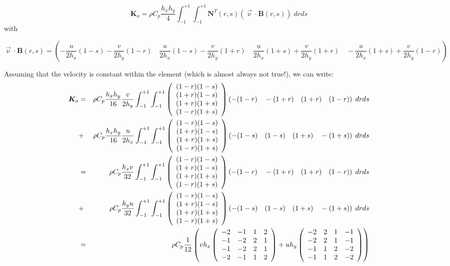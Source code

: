 \[
{\bm K}_a = \rho C_p \frac{h_xh_y}{4}
\int_{-1}^{+1} \int_{-1}^{+1} {\bm N}^T(r,s) (\vec\upnu \cdot {\bm B}(r,s)) \; dr ds
\]
with 
\begin{small}
\[
\vec\upnu \cdot  {\bm B}(r,s) 
=
\left(
-\frac{u}{2h_x}(1-s)\!-\!\frac{v}{2h_y}(1-r) \quad
 \frac{u}{2h_x}(1-s)\!-\!\frac{v}{2h_y}(1+r) \quad
 \frac{u}{2h_x}(1+s)\!+\!\frac{v}{2h_y}(1+r) \quad
-\frac{u}{2h_x}(1+s)\!+\!\frac{v}{2h_y}(1-r) 
\right)
\]
\end{small}
Assuming that the velocity is constant within the element (which is almost always not true!), we can write:
\begin{eqnarray}
{\bm K}_a 
&=&
\rho C_p \frac{h_xh_y}{16}\frac{v}{2h_y}
\int_{-1}^{+1} \int_{-1}^{+1} 
\left(
\begin{array}{c}
(1-r)(1-s)\\
(1+r)(1-s)\\
(1+r)(1+s)\\
(1-r)(1+s)
\end{array}
\right)
\left(
-(1-r) \quad
-(1+r) \quad
(1+r) \quad
(1-r) 
\right) \;
dr ds \nonumber\\
&+& 
\rho C_p \frac{h_xh_y}{16}\frac{u}{2h_x}
\int_{-1}^{+1} \int_{-1}^{+1} 
\left(
\begin{array}{c}
(1-r)(1-s)\\
(1+r)(1-s)\\
(1+r)(1+s)\\
(1-r)(1+s)
\end{array}
\right)
\left(
-(1-s) \quad
(1-s) \quad
(1+s) \quad
-(1+s) 
\right) \;
dr ds  \nonumber\\
&=&
\rho C_p \frac{h_x v}{32}
\int_{-1}^{+1} \int_{-1}^{+1} 
\left(
\begin{array}{c}
(1-r)(1-s)\\
(1+r)(1-s)\\
(1+r)(1+s)\\
(1-r)(1+s)
\end{array}
\right)
\left(
-(1-r) \quad
-(1+r) \quad
(1+r) \quad
(1-r) 
\right) \;
dr ds \nonumber\\
&+& 
\rho C_p \frac{h_y u}{32}
\int_{-1}^{+1} \int_{-1}^{+1} 
\left(
\begin{array}{c}
(1-r)(1-s)\\
(1+r)(1-s)\\
(1+r)(1+s)\\
(1-r)(1+s)
\end{array}
\right)
\left(
-(1-s) \quad
(1-s) \quad
(1+s) \quad
-(1+s) 
\right) \;
dr ds \nonumber \\
&=& 
\rho C_p \frac{1}{12} 
\left(
v h_x 
\left(
\begin{array}{cccc}
-2 &-1 &1 &2 \\
-1 &-2 &2 &1 \\
-1 &-2 &2 &1 \\
-2 &-1 &1 &2
\end{array}
\right)
+ u h_y
\left(
\begin{array}{cccc}
-2 &2 &1 &-1 \\
-2 &2 &1 &-1 \\
-1 &1 &2 &-2 \\
-1 &1 &2 &-2
\end{array}
\right)
\right) \nonumber
\end{eqnarray}
